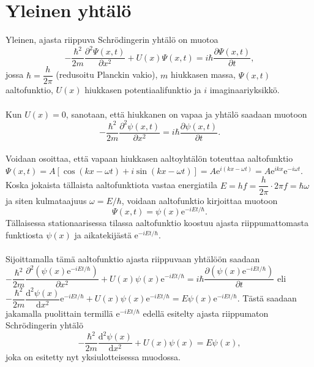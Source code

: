 \documentclass{article}
\begin{document}
\newpage
\section{Yleinen yhtälö}
Yleinen, ajasta riippuva Schrödingerin yhtälö on muotoa $$-\dfrac{\hbar ^2}{2m}\dfrac{\partial ^2 \Psi (x, t)}{\partial x^2}+U(x)\Psi (x, t)=i\hbar \dfrac{\partial \Psi (x, t)}{\partial t},$$ jossa \(\hbar =\dfrac{h}{2\pi}\) (redusoitu Planckin vakio), \(m\) hiukkasen massa, \(\Psi (x, t)\) aaltofunktio, \(U(x)\) hiukkasen potentiaalifunktio ja \(i\) imaginaariyksikkö.\\
 \\
Kun \(U(x)=0\), sanotaan, että hiukkanen on vapaa ja yhtälö saadaan muotoon $$-\dfrac{\hbar ^2}{2m} \dfrac{\partial ^2 \psi (x, t)}{\partial x^2}=i\hbar \dfrac{\partial \psi (x, t)}{\partial t}.$$
 \\
Voidaan osoittaa, että vapaan hiukkasen aaltoyhtälön toteuttaa aaltofunktio \(\Psi (x, t)=A[\cos (kx-\omega t)+i\sin (kx-\omega t)]=A\text{e}^{i(kx-\omega t)}=A\text{e}^{ikx}\text{e}^{-i\omega t}\). Koska jokaista tällaista aaltofunktiota vastaa energiatila \(E=hf= \dfrac{h}{2\pi}\cdot 2\pi f=\hbar \omega\) ja siten kulmataajuus \(\omega = E/\hbar\), voidaan aaltofunktio kirjoittaa muotoon $$\Psi (x,t)=\psi (x)\text{e}^{-iEt/\hbar}.$$ Tällaisessa stationaarisessa tilassa aaltofunktio koostuu ajasta riippumattomasta funktiosta \(\psi (x)\) ja aikatekijästä \(\text{e}^{-iEt/\hbar}\).\\
 \\
Sijoittamalla tämä aaltofunktio ajasta riippuvaan yhtälöön saadaan \(-\dfrac{\hbar ^2}{2m}\dfrac{\partial ^2 (\psi (x)\text{e}^{-iEt/\hbar})}{\partial x^2}+U(x)\psi (x)\text{e}^{-iEt/\hbar}=i\hbar \dfrac{\partial (\psi (x)\text{e}^{-iEt/\hbar})}{\partial t}\) eli \(-\dfrac{\hbar ^2}{2m}\dfrac{\text{d}^2\psi (x)}{\text{d}x^2}\text{e}^{-iEt/\hbar}+U(x)\psi (x)\text{e}^{-iEt/\hbar}=E\psi (x)\text{e}^{-iEt/\hbar}\). Tästä saadaan jakamalla puolittain termillä \(\text{e}^{-iEt/\hbar}\) edellä esitelty ajasta riippumaton Schrödingerin yhtälö $$-\dfrac{\hbar ^2}{2m}\dfrac{\text{d}^2 \psi (x)}{\text{d}x^2}+U(x)\psi (x)=E\psi (x),$$ joka on esitetty nyt yksiulotteisessa muodossa.

\newpage
\end{document}
